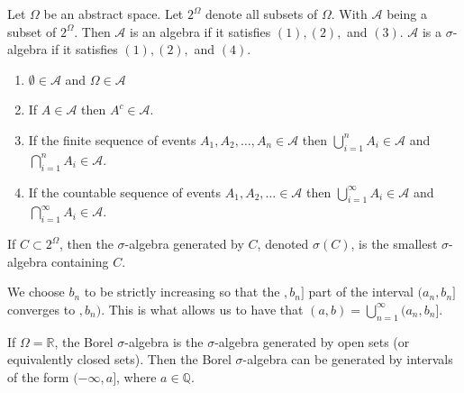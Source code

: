 \documentclass[../main.tex]{subfiles}
\begin{document}
\begin{definition}\label{def:sigma algebra}
Let $\Omega$ be an abstract space. Let $2^{\Omega}$ denote all subsets of $\Omega$. With $\mathcal{A}$ being a subset of $2^\Omega$. Then $\mathcal{A}$ is an algebra if it satisfies $(1),(2),$ and $(3)$. $\mathcal{A}$ is a $\sigma$-algebra if it satisfies $(1), (2),$ and $(4)$.
\begin{enumerate}
    \item $\emptyset \in \mathcal{A}$ and $\Omega \in \mathcal{A}$
    \item If $ A \in \mathcal{A}$ then $A^c \in \mathcal{A}$.
    \item If the finite sequence of events $A_1, A_2, \dots ,A_n \in \mathcal{A}$ then $\bigcup^n_{i=1}{A_i} \in \mathcal{A}$ and $\bigcap^n_{i=1}{A_i} \in \mathcal{A}$.
    \item If the countable sequence of events $A_1, A_2, \dots \in \mathcal{A}$ then $\bigcup^\infty_{i=1}{A_i} \in \mathcal{A}$ and $ \bigcap^\infty_{i=1}{A_i} \in \mathcal{A}    $. 
\end{enumerate}
    
\end{definition}



\begin{remark}
If $ C \subset 2^\Omega$, then the $\sigma$-algebra generated by $C$, denoted $ \sigma(C) $, is the smallest $ \sigma $-algebra containing $C$.
\end{remark}

We choose $b_n$ to be strictly increasing so that the $ ,b_n]$ part of the interval $ (a_n, b_n] $ converges to $ , b_n)$. This is what allows us to have that $(a,b) = \bigcup^\infty_{n=1}{(a_n, b_n]}$. 



\begin{theorem}
If $\Omega = \mathbb{R}$, the Borel $\sigma$-algebra is the $\sigma$-algebra generated by open sets (or equivalently closed sets). Then the Borel $\sigma $-algebra can be generated by intervals of the form $ (-\infty, a] $, where $ a \in \mathbb{Q} $.
\end{theorem}
\end{document}
